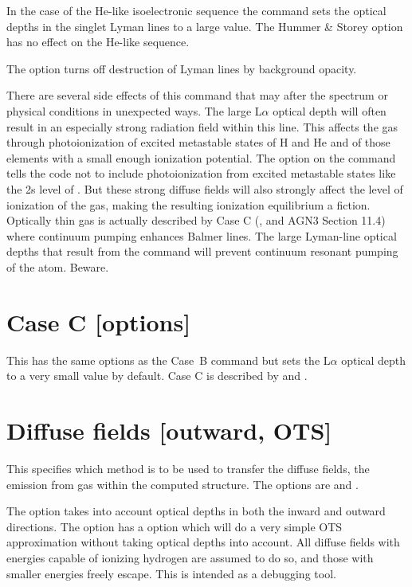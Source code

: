 In the case of the He-like isoelectronic sequence
the  command
sets the optical depths in the singlet Lyman lines to a large value.
The
Hummer \& Storey option has no effect on the He-like sequence.

The  option turns off destruction of
Lyman lines by background opacity.

There are several side effects of this command that may after the spectrum
or physical conditions in unexpected ways.
The large L$\alpha $ optical depth will
often result in an especially strong radiation field within this line.
This affects the gas through photoionization of excited metastable states
of H and He and of those elements
with a small enough ionization potential.
The  option on the 
command tells the code not to
include photoionization from excited metastable states like the 2s level
of \hO.
But these strong diffuse fields will also strongly affect the level
of ionization of the gas, making the resulting ionization equilibrium a
fiction.
Optically thin gas is actually described by Case C
(\citealp{Ferland1999}, \citealp{LuridianaEtAl09} and
AGN3 Section 11.4) where continuum pumping enhances Balmer lines.
The large
Lyman-line optical depths that result from the 
command will prevent
continuum resonant pumping of the atom.  Beware.

\section{Case C [options]}

This has the same options as the Case~B command but sets the
L$\alpha$ optical depth to a very small value by default.
Case C is described by \citet{Ferland1999} and
\citet{LuridianaEtAl09}.

\section{Diffuse fields [outward, OTS]}

This specifies which method is to be used to transfer the diffuse fields,
the emission from gas within the computed structure.
The options are  and .

The  option takes into account optical depths
in both the inward and outward directions.
The  option has a  option which will
do a very simple OTS approximation without taking optical depths into
account.
All diffuse fields with energies capable of ionizing hydrogen
are assumed to do so, and those with smaller energies freely escape.
This is intended as a debugging tool.

